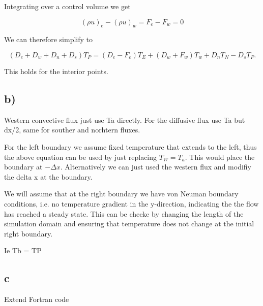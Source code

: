 \documentclass{article}
\begin{document}
Integrating over a control volume we get

\begin{equation}
(\rho u)_e - (\rho u)_w  = F_e - F_w = 0
\end{equation}

We can therefore simplify to

\begin{equation}
(D_e + D_w + D_n + D_s) T_P = (D_e - F_e) T_E + (D_w+F_w) T_w + D_n T_N - D_s T_P.
\end{equation}

This holds for the interior points.

\subsection{b)}

Western convective flux just use Ta directly. 
For the diffusive flux use Ta but dx/2, same for souther and norhtern fluxes.

For the left boundary we assume fixed temperature that extends to the left, thus the above equation can be used by just replacing $T_W = T_a$. This would place the boundary at $-\Delta x$. Alternatively we can just used the western flux and modifiy the delta x at the boundary.

We will assume that at the right boundary we have von Neuman boundary conditions, i.e. no temperature gradient in the y-direction, indicating the the flow has reached a steady state. This can be checke by changing the length of the simulation domain and ensuring that temperature does not change at the initial right boundary.

Ie Tb = TP

\subsection{c}

Extend Fortran code
\end{document}

